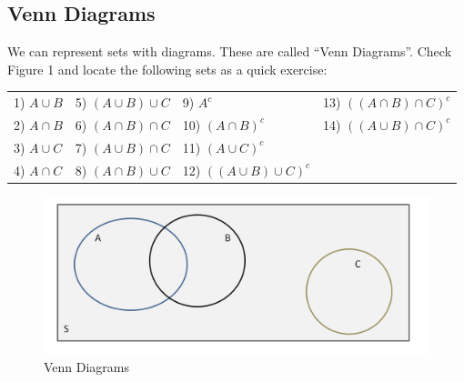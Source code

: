 \documentclass[11pt]{article}
\begin{document}
\subsection*{Venn Diagrams}
 We can represent sets with diagrams. These are called ``Venn Diagrams''. Check Figure 1 and locate the following sets as a quick exercise:\\


\begin{tabular}{llll}
	1) $A \cup B$ & 5) $(A \cup B) \cup C$ & 9) $A^c$ & 13) $((A \cap B) \cap C)^c$\\
	2) $A \cap B$ & 6) $(A \cap B) \cap C$ & 10) $(A \cap B)^c$ & 14) $((A \cup B) \cap C)^c$\\
	3) $A \cup C$ & 7) $(A \cup B) \cap C$ & 11) $(A \cup C)^c$ &\\
	4) $A \cap C$ & 8) $(A \cap B) \cup C$ & 12) $((A \cup B) \cup C)^c$ &\\
\end{tabular}

\begin{figure}[htp]
\centering
\includegraphics[scale=0.50]{venn.png}
\caption{Venn Diagrams}
\label{}
\end{figure}
\end{document}
